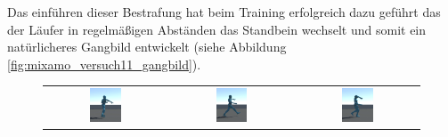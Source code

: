 Das einführen dieser Bestrafung hat beim Training erfolgreich dazu geführt das der Läufer in regelmäßigen Abständen das Standbein wechselt und somit ein natürlicheres Gangbild entwickelt (siehe Abbildung \ref{fig:mixamo_versuch11_gangbild}).

\begin{figure}[H]
  \centering
  \begin{tabular}{ccc}
    \includegraphics[width=0.27\textwidth]{img/charakter_mixamo_laufen1} & \includegraphics[width=0.27\textwidth]{img/charakter_mixamo_laufen2}  & \includegraphics[width=0.27\textwidth]{img/charakter_mixamo_laufen3} \\

\end{tabular}
\end{figure}
